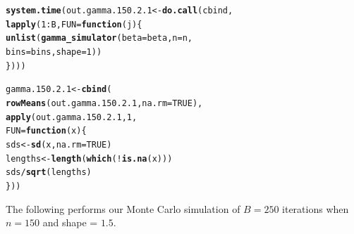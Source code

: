 \documentclass[11pt]{article}\usepackage[]{graphicx}\usepackage[]{color}
\makeatletter
\newcommand{\hlnum}[1]{\textcolor[rgb]{0.686,0.059,0.569}{#1}}%
\newcommand{\hlopt}[1]{\textcolor[rgb]{0,0,0}{#1}}%
\newcommand{\hlstd}[1]{\textcolor[rgb]{0.345,0.345,0.345}{#1}}%
\newcommand{\hlkwa}[1]{\textcolor[rgb]{0.161,0.373,0.58}{\textbf{#1}}}%
\newcommand{\hlkwb}[1]{\textcolor[rgb]{0.69,0.353,0.396}{#1}}%
\newcommand{\hlkwc}[1]{\textcolor[rgb]{0.333,0.667,0.333}{#1}}%
\newcommand{\hlkwd}[1]{\textcolor[rgb]{0.737,0.353,0.396}{\textbf{#1}}}%
\newenvironment{kframe}{%
 \def\at@end@of@kframe{}%
 \ifinner\ifhmode%
  \def\at@end@of@kframe{\end{minipage}}%
  \begin{minipage}{\columnwidth}%
 \fi\fi%
 \def\FrameCommand##1{\hskip\@totalleftmargin \hskip-\fboxsep
 \colorbox{shadecolor}{##1}\hskip-\fboxsep
     \hskip-\linewidth \hskip-\@totalleftmargin \hskip\columnwidth}%
 \MakeFramed {\advance\hsize-\width
   \@totalleftmargin\z@ \linewidth\hsize
   \@setminipage}}%
 {\par\unskip\endMakeFramed%
 \at@end@of@kframe}
\newenvironment{knitrout}{}{} %
\makeatother
\begin{document}
\begin{knitrout}
\color{fgcolor}\begin{kframe}
\begin{alltt}
\hlkwd{system.time}\hlstd{(out.gamma.150.2.1} \hlkwb{<-} \hlkwd{do.call}\hlstd{(cbind,}
  \hlkwd{lapply}\hlstd{(}\hlnum{1}\hlopt{:}\hlstd{B,} \hlkwc{FUN} \hlstd{=} \hlkwa{function}\hlstd{(}\hlkwc{j}\hlstd{)\{}
    \hlkwd{unlist}\hlstd{(}\hlkwd{gamma_simulator}\hlstd{(}\hlkwc{beta} \hlstd{= beta,} \hlkwc{n} \hlstd{= n,}
      \hlkwc{bins} \hlstd{= bins,} \hlkwc{shape} \hlstd{=} \hlnum{1}\hlstd{))}
\hlstd{\})))}
\end{alltt}


{\ttfamily\noindent\bfseries\color{errorcolor}{\#\# Error in eval(family\$initialize): non-positive values not allowed for the 'gamma' family}}

{\ttfamily\noindent\itshape\color{messagecolor}{\#\# Timing stopped at: 0.007 0 0.007}}\end{kframe}
\end{knitrout}

\begin{knitrout}
\color{fgcolor}\begin{kframe}
\begin{alltt}
\hlstd{gamma.150.2.1} \hlkwb{<-} \hlkwd{cbind}\hlstd{(}
  \hlkwd{rowMeans}\hlstd{(out.gamma.150.2.1,} \hlkwc{na.rm} \hlstd{=} \hlnum{TRUE}\hlstd{),}
  \hlkwd{apply}\hlstd{(out.gamma.150.2.1,} \hlnum{1}\hlstd{,}
  \hlkwc{FUN} \hlstd{=} \hlkwa{function}\hlstd{(}\hlkwc{x}\hlstd{)\{}
    \hlstd{sds} \hlkwb{<-} \hlkwd{sd}\hlstd{(x,} \hlkwc{na.rm} \hlstd{=} \hlnum{TRUE}\hlstd{)}
    \hlstd{lengths} \hlkwb{<-} \hlkwd{length}\hlstd{(}\hlkwd{which}\hlstd{(}\hlopt{!}\hlkwd{is.na}\hlstd{(x)))}
    \hlstd{sds} \hlopt{/} \hlkwd{sqrt}\hlstd{(lengths)}
  \hlstd{\}))}
\end{alltt}


{\ttfamily\noindent\bfseries\color{errorcolor}{\#\# Error in is.data.frame(x): object 'out.gamma.150.2.1' not found}}\end{kframe}
\end{knitrout}

The following performs our Monte Carlo simulation of $B = 250$ iterations 
when $n = 150$ and shape = $1.5$.
\end{document}
